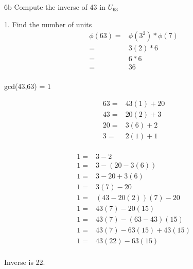 \begin{question}{6b}
Compute the inverse of 43 in $U_{63}$

1. Find the number of units
\begin{align*}
\phi(63) =& \phi(3^2) * \phi(7)\\
=& 3(2) * 6\\
=& 6 * 6\\
=& 36\\
\end{align*}

gcd(43,63) = $1$

\begin{align*}
63 =& 43(1) + 20\\
43 =& 20(2) + 3\\
20 =& 3(6)  + 2\\
3  =& 2(1)  + 1\\
\end{align*}

\begin{align*}
1 =& 3 - 2\\
1 =& 3 - (20-3(6))\\
1 =& 3 - 20 +3(6)\\
1 =& 3(7) - 20\\
1 =& (43-20(2))(7) - 20\\
1 =& 43(7) -20(15)\\
1 =& 43(7) -(63-43)(15)\\
1 =& 43(7) -63(15) +43(15)\\
1 =& 43(22) -63(15)\\
\end{align*}

Inverse is 22.
\end{question}




